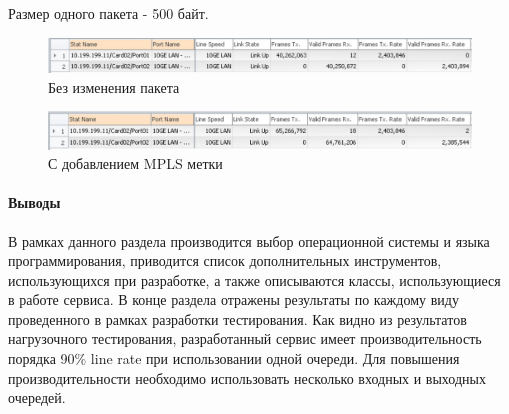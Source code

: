 Размер одного пакета - 500 байт.

\begin{figure}[!h]
\centering
\includegraphics[scale=0.6]{pictures/rtsp_output}
\caption{Без изменения пакета}
\label{pic:rtsp_output}
\end{figure}

\begin{figure}[!h]
\centering
\includegraphics[scale=0.6]{pictures/rtsp_mpls_output}
\caption{С добавлением MPLS метки}
\label{pic:rtsp_mpls_output}
\end{figure}

\paragraph{Выводы}

В рамках данного раздела производится выбор операционной системы и языка программирования, приводится список дополнительных инструментов, использующихся при разработке, а также описываются классы, использующиеся в работе сервиса. В конце раздела отражены результаты по каждому виду проведенного в рамках разработки тестирования. Как видно из результатов нагрузочного тестирования, разработанный сервис имеет производительность порядка  90\% line rate при использовании одной очереди. Для повышения производительности необходимо использовать несколько входных и выходных очередей.
